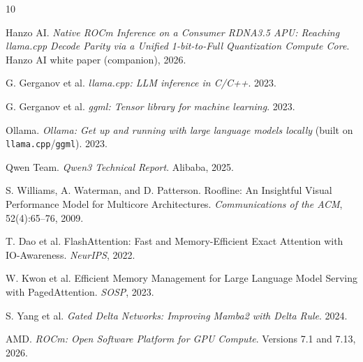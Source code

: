 \documentclass[11pt]{article}
\begin{document}
\begin{thebibliography}{10}

Hanzo AI. \textit{Native ROCm Inference on a Consumer RDNA3.5 APU: Reaching llama.cpp Decode Parity
via a Unified 1-bit-to-Full Quantization Compute Core}. Hanzo AI white paper (companion), 2026.

G. Gerganov et al. \textit{llama.cpp: LLM inference in C/C++}. 2023.

G. Gerganov et al. \textit{ggml: Tensor library for machine learning}. 2023.

Ollama. \textit{Ollama: Get up and running with large language models locally} (built on
\texttt{llama.cpp}/\texttt{ggml}). 2023.

Qwen Team. \textit{Qwen3 Technical Report}. Alibaba, 2025.

S. Williams, A. Waterman, and D. Patterson. Roofline: An Insightful Visual Performance Model for
Multicore Architectures. \textit{Communications of the ACM}, 52(4):65--76, 2009.

T. Dao et al. FlashAttention: Fast and Memory-Efficient Exact Attention with IO-Awareness.
\textit{NeurIPS}, 2022.

W. Kwon et al. Efficient Memory Management for Large Language Model Serving with PagedAttention.
\textit{SOSP}, 2023.

S. Yang et al. \textit{Gated Delta Networks: Improving Mamba2 with Delta Rule}. 2024.

AMD. \textit{ROCm: Open Software Platform for GPU Compute}. Versions 7.1 and 7.13, 2026.

\end{thebibliography}
\end{document}
